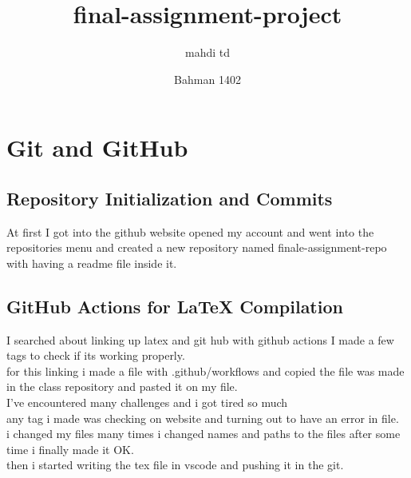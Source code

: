 \documentclass{article}
\title{final-assignment-project}
\author{mahdi td}
\date{Bahman 1402}
\begin{document}
\maketitle
\newpage
\section{Git and GitHub}
\subsection{Repository Initialization and Commits}
At first I got into the github website opened my account and went into the repositories menu and created a new repository named finale-assignment-repo with having a readme file inside it.
\subsection{GitHub Actions for LaTeX Compilation}
I searched about linking up latex and git hub with github actions I made a few tags to check if its working properly.\\
for this linking i made a file with .github/workflows and copied the file was made in the class repository and pasted it on my file.\\
I've encountered many challenges and i got tired so much\\
any tag i made was checking on website and turning out to have an error in file.\\
i changed my files many times i changed names and paths to the files after some time i finally made it OK.\\
then i started writing the tex file in vscode and pushing it in the git.
\end{document}
